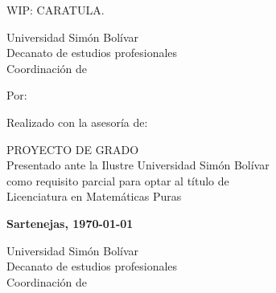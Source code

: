 
\caratulafalse
\paginatitulotrue
\resumenfalse
\dedicatoriafalse
\agradecimientosfalse
\listastrue
\toctrue
\introfalse
{}
\basicostrue


\frontmatter
\ifcaratula\newpage
WIP: CARATULA.
\fi
\ifpaginatitulo\newpage
\bgroup
    \centering
    \thispagestyle{empty}

    \PrintUsbLogo
    {
        Universidad Simón Bolívar\\
        Decanato de estudios profesionales\\
        Coordinación de \coord
    }

    \vspace{1.5cm}

    \UppercaseBold{
        \wrapto[14cm][\centering]
        {\MainTitle}
    }

    \vspace{1.5cm}

    Por:
    \\
    \autor

    \vspace{1.5cm}

    Realizado con la asesoría de:
    \\
    \tutor

    \vspace{3cm}

    \MakeUppercase{Proyecto de Grado}\\
    Presentado ante la Ilustre Universidad Simón Bolívar\\
    como requisito parcial para optar al título de\\
    Licenciatura en Matemáticas Puras

    \vspace{\fill}

    \textbf{Sartenejas, \today}\par
\egroup
\fi
\ifresumen\newpage
\PrintUsbLogo
    {
        Universidad Simón Bolívar\\
        Decanato de estudios profesionales\\
        Coordinación de \coord
    }

